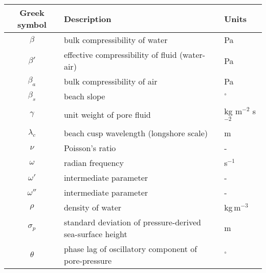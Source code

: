 \setlongtables
\begin{longtable}{cll}
	\hline
	Greek symbol & Description & Units\\
	\hline
	\endhead
	\hline
	\endfoot
	
	$\beta$ & bulk compressibility of water & Pa\\
	$\beta'$ & effective compressibility of fluid (water-air) & Pa\\
	$\beta_a$ & bulk compressibility of air & Pa\\
	$\beta_s$ & beach slope & $^\circ$\\
	$\gamma$ & unit weight of pore fluid & kg m$^{-2}$ s$^{-2}$\\
	$\lambda_c$ & beach cusp wavelength (longshore scale) & m\\
	$\nu$ & Poisson's ratio & -\\
	$\omega$ & radian frequency & s$^{-1}$\\
	$\omega'$ & \citet{Yamamoto_etal1978} intermediate parameter & -\\
	$\omega''$ & \citet{Yamamoto_etal1978} intermediate parameter & -\\
	$\rho$ & density of water & kg\,m$^{-3}$\\
	$\sigma_p$ & standard deviation of pressure-derived sea-surface height & m\\
	$\theta$ & phase lag of oscillatory component of pore-pressure & $^\circ$\\
	
	\hline
\end{longtable}


